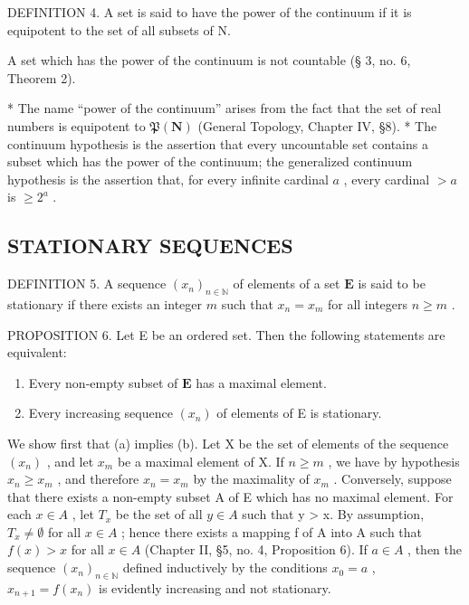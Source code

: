 DEFINITION 4. A set is said to have the power of the continuum if it is equipotent to the set of all subsets of N.

A set which has the power of the continuum is not countable (§ 3, no. 6, Theorem 2).

* The name ``power of the continuum'' arises from the fact that the set of real numbers is equipotent to \(\mathfrak{P}(\mathbf{N})\) (General Topology, Chapter IV, §8). * The continuum hypothesis is the assertion that every uncountable set contains a subset which has the power of the continuum; the generalized continuum hypothesis is the assertion that, for every infinite cardinal \(a\) , every cardinal \(>a\) is \(\geqslant 2^{a}\) .

\subsection{STATIONARY SEQUENCES}

DEFINITION 5. A sequence \((x_{n})_{n\in \mathbb{N}}\) of elements of a set \(\mathbf{E}\) is said to be stationary if there exists an integer \(m\) such that \(x_{n} = x_{m}\) for all integers \(n\geqslant m\) .

PROPOSITION 6. Let E be an ordered set. Then the following statements are equivalent:

\begin{enumerate}
\def\labelenumi{(\alph{enumi})}
\item
  Every non-empty subset of \(\mathbf{E}\) has a maximal element.
\item
  Every increasing sequence \((x_{n})\) of elements of E is stationary.
\end{enumerate}

We show first that (a) implies (b). Let X be the set of elements of the sequence \((x_{n})\) , and let \(x_{m}\) be a maximal element of X. If \(n \geqslant m\) , we have by hypothesis \(x_{n} \geqslant x_{m}\) , and therefore \(x_{n} = x_{m}\) by the maximality of \(x_{m}\) . Conversely, suppose that there exists a non-empty subset A of E which has no maximal element. For each \(x \in A\) , let \(T_{x}\) be the set of all \(y \in A\) such that y \textgreater{} x. By assumption, \(T_{x} \neq \emptyset\) for all \(x \in A\) ; hence there exists a mapping f of A into A such that \(f(x) > x\) for all \(x \in A\) (Chapter II, §5, no. 4, Proposition 6). If \(a \in A\) , then the sequence \((x_{n})_{n \in \mathbb{N}}\) defined inductively by the conditions \(x_{0} = a\) , \(x_{n+1} = f(x_{n})\) is evidently increasing and not stationary.

